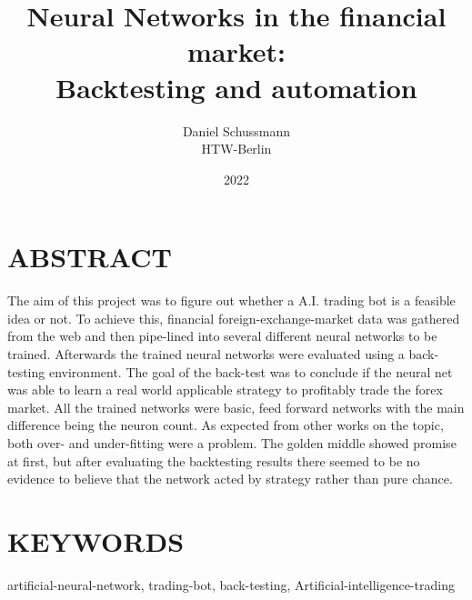 \documentclass{article}
\title{Neural Networks in the financial market:\\ Backtesting and automation}
\author{Daniel Schussmann \\ HTW-Berlin }
\date{2022}
\begin{document}
\maketitle




\section*{ABSTRACT}

The aim of this project was to figure out whether a A.I. trading bot is a feasible idea or not. To achieve this, financial foreign-exchange-market data was gathered from the web and then pipe-lined into several different neural networks to be trained. Afterwards the trained neural networks were evaluated using a back-testing environment. The goal of the back-test was to conclude if the neural net was able to learn a real world applicable strategy to profitably trade the forex market. All the trained networks were basic, feed forward networks\cite{MLB112} with the main difference being the neuron count. As expected from \cite{overfit} \cite{MLB123} other works on the topic, both over- and under-fitting were a problem. The golden middle showed promise at first, but after evaluating the backtesting results there seemed to be no evidence to believe that the network acted by strategy rather than pure chance.

\section*{KEYWORDS}
artificial-neural-network, trading-bot, back-testing, Artificial-intelligence-trading
\end{document}
